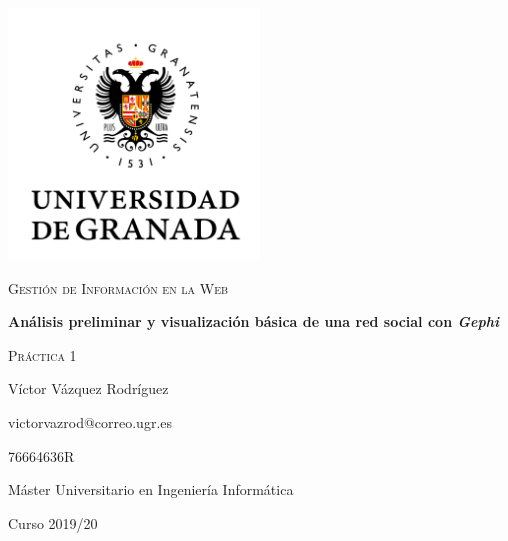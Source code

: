 \documentclass{article}
\begin{document}
\begin{titlepage}
    \centering
    \includegraphics[width=0.5\textwidth]{images/logo-ugr.png}\par
    \vspace{1cm}
    {\Large\scshape Gestión de Información en la Web \par}
    {\huge\bfseries Análisis preliminar y visualización básica de una red social
    con \textit{Gephi} \par}
    \vspace{0.2cm}
    {\scshape Práctica 1 \par}
    \vfill
    {\large Víctor Vázquez Rodríguez  \par}
    {victorvazrod@correo.ugr.es \par}
    {76664636R \par}
    \vfill
    {\large Máster Universitario en Ingeniería Informática \par}
    \vspace{0.2cm}
    {Curso 2019/20 \par}
\end{titlepage}

\tableofcontents\newpage

\newpage
\newpage



\end{document}
